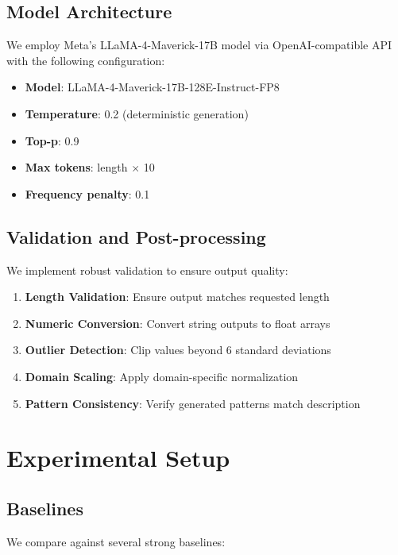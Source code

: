 \documentclass[11pt]{article}
\begin{document}
\subsection{Model Architecture}

We employ Meta's LLaMA-4-Maverick-17B model via OpenAI-compatible API with the following configuration:

\begin{itemize}
    \item \textbf{Model}: LLaMA-4-Maverick-17B-128E-Instruct-FP8
    \item \textbf{Temperature}: 0.2 (deterministic generation)
    \item \textbf{Top-p}: 0.9
    \item \textbf{Max tokens}: length $\times$ 10
    \item \textbf{Frequency penalty}: 0.1
\end{itemize}

\subsection{Validation and Post-processing}

We implement robust validation to ensure output quality:

\begin{enumerate}
    \item \textbf{Length Validation}: Ensure output matches requested length
    \item \textbf{Numeric Conversion}: Convert string outputs to float arrays
    \item \textbf{Outlier Detection}: Clip values beyond 6 standard deviations
    \item \textbf{Domain Scaling}: Apply domain-specific normalization
    \item \textbf{Pattern Consistency}: Verify generated patterns match description
\end{enumerate}

\section{Experimental Setup}

\subsection{Baselines}

We compare against several strong baselines:
\end{document}
